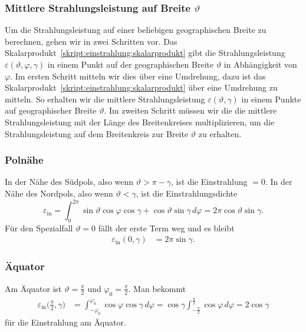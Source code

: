\subsubsection{Mittlere Strahlungsleistung auf Breite $\vartheta$}
Um die Strahlungsleistung auf einer beliebigen geographischen
Breite zu berechnen, gehen wir in zwei Schritten vor.
Das Skalarprodukt~\eqref{skript:einstrahlung:skalarprodukt} 
gibt die Strahlungsleistung $\varepsilon(\vartheta,\varphi,\gamma)$
in einem Punkt auf der geographischen
Breite $\vartheta$ in Abhängigkeit von $\varphi$.
Im ersten Schritt mitteln wir dies über eine Umdrehung, dazu
ist das Skalarprodukt~\eqref{skript:einstrahlung:skalarprodukt} über eine
Umdrehung zu mitteln.
So erhalten wir die mittlere Strahlungsleistung $\varepsilon(\vartheta,\gamma)$
in einem Punkte auf geographischer Breite $\vartheta$.
Im zweiten Schritt müssen wir die die mittlere Strahlungsleistung mit
der Länge des Breitenkreises multiplizieren, um die Strahlungsleistung
auf dem Breitenkreis zur Breite $\vartheta$ zu erhalten.

\subsubsection{Polnähe}
In der Nähe des Südpols, also wenn $\vartheta > \pi - \gamma$,
ist die Einstrahlung $=0$.
In der Nähe des Nordpols, also wenn $\vartheta < \gamma$, ist die
Einstrahlungsdichte
\[
\varepsilon_{\text{in}}
=
\int_0^{2\pi}
\sin\vartheta\cos\varphi\cos\gamma
+
\cos\vartheta\sin\gamma
\,d\varphi
=
2\pi\cos\vartheta\sin\gamma.
\]
Für den Spezialfall $\vartheta=0$ fällt der erste Term weg und es
bleibt 
\begin{align*}
\varepsilon_{\text{in}}(0,\gamma)
&=
2\pi\sin\gamma.
\end{align*}

\subsubsection{Äquator}
Am Äquator ist $\vartheta=\frac{\pi}2$ und $\varphi_0=\frac{\pi}2$.
Man bekommt
\begin{align*}
\varepsilon_{\text{in}}\biggl(\frac{\pi}2,\gamma\biggr)
&=
\int_{-\varphi_0}^{\varphi_0}
\cos\varphi\cos\gamma\,d\varphi
=
\cos\gamma
\int_{-\frac{\pi}2}^{\frac{\pi}2}
\cos\varphi
\,d\varphi
=
2\cos\gamma
\end{align*}
für die Einstrahlung am Äquator.

